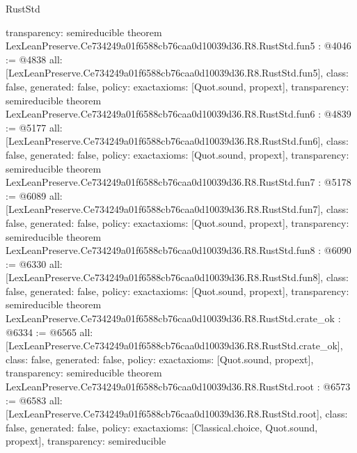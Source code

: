 \begin{lexlean}{RustStd}
\begin{coremodule}
{  transparency: semireducible
}
theorem LexLeanPreserve.Ce734249a01f6588cb76caa0d10039d36.R8.RustStd.fun5 : @4046 := @4838 {
  all: [LexLeanPreserve.Ce734249a01f6588cb76caa0d10039d36.R8.RustStd.fun5],
  class: false,
  generated: false,
  policy: exact{axioms: [Quot.sound, propext]},
  transparency: semireducible
}
theorem LexLeanPreserve.Ce734249a01f6588cb76caa0d10039d36.R8.RustStd.fun6 : @4839 := @5177 {
  all: [LexLeanPreserve.Ce734249a01f6588cb76caa0d10039d36.R8.RustStd.fun6],
  class: false,
  generated: false,
  policy: exact{axioms: [Quot.sound, propext]},
  transparency: semireducible
}
theorem LexLeanPreserve.Ce734249a01f6588cb76caa0d10039d36.R8.RustStd.fun7 : @5178 := @6089 {
  all: [LexLeanPreserve.Ce734249a01f6588cb76caa0d10039d36.R8.RustStd.fun7],
  class: false,
  generated: false,
  policy: exact{axioms: [Quot.sound, propext]},
  transparency: semireducible
}
theorem LexLeanPreserve.Ce734249a01f6588cb76caa0d10039d36.R8.RustStd.fun8 : @6090 := @6330 {
  all: [LexLeanPreserve.Ce734249a01f6588cb76caa0d10039d36.R8.RustStd.fun8],
  class: false,
  generated: false,
  policy: exact{axioms: [Quot.sound, propext]},
  transparency: semireducible
}
theorem LexLeanPreserve.Ce734249a01f6588cb76caa0d10039d36.R8.RustStd.crate_ok : @6334 := @6565 {
  all: [LexLeanPreserve.Ce734249a01f6588cb76caa0d10039d36.R8.RustStd.crate_ok],
  class: false,
  generated: false,
  policy: exact{axioms: [Quot.sound, propext]},
  transparency: semireducible
}
theorem LexLeanPreserve.Ce734249a01f6588cb76caa0d10039d36.R8.RustStd.root : @6573 := @6583 {
  all: [LexLeanPreserve.Ce734249a01f6588cb76caa0d10039d36.R8.RustStd.root],
  class: false,
  generated: false,
  policy: exact{axioms: [Classical.choice, Quot.sound, propext]},
  transparency: semireducible
}


\end{coremodule}
\end{lexlean}
